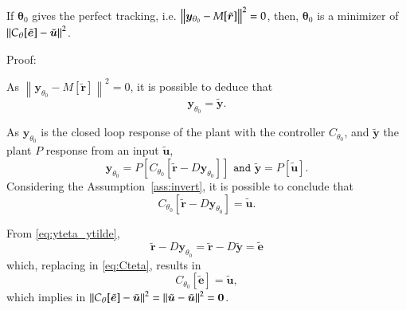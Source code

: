 
\begin{thm} 
   \label{thr:theoremVRFT}
   If $\bm{\theta}_0$ gives the perfect tracking, i.e. $\left\lVert\bm{y}_{\theta_0} - M[\tilde{\bm{r}}] \right\rVert^2 = 0$, then, $\bm{\theta}_0$ is a minimizer of $\left\lVert C_\theta[\tilde{\bm{e}}] - \tilde{\bm{u}}\right\rVert^2$.
\end{thm}

Proof:

As $\left\|\bm{y}_{\theta_0}-M[\tilde{\bm{r}}]\right\|^{2}=0$, it is possible to deduce that
\begin{equation}
\bm{y}_{\theta_0}=\tilde{\bm{y}}.
\label{eq:yteta_ytilde}
\end{equation}

As $\bm{y}_{\theta_0}$ is the closed loop response of the plant with the controller $C_{\theta_0}$, and $\tilde{\bm{y}}$ the plant $P$ response from an input $\tilde{\bm{u}}$,
\begin{equation*}
\bm{y}_{\theta_0}=P\left[C_{\theta_{0}}\left[\tilde{\bm{r}}-D \bm{y}_{\theta_0}\right]\right] \texttt{ and } \tilde{\bm{y}}=P[\tilde{\bm{u}}].
\label{eq:}
\end{equation*}
Considering the Assumption~\ref{ass:invert}, it is possible to conclude that
\begin{equation}
   C_{\theta_{0}}\left[\tilde{\bm{r}}-D \bm{y}_{\theta_0}\right]=\tilde{\bm{u}}.
\label{eq:Cteta}
\end{equation}

From \eqref{eq:yteta_ytilde},
\begin{equation*}
   \tilde{\bm{r}}-D \bm{y}_{\theta_0}=\tilde{\bm{r}}-D \tilde{\bm{y}}=\tilde{\bm{e}}
\label{eq:}
\end{equation*}
which, replacing in \eqref{eq:Cteta}, results in
\begin{equation*}
C_{\theta_{0}}[\tilde{\bm{e}}]=\tilde{\bm{u}},
\label{eq:} 
\end{equation*}
which implies in $\left\lVert C_\theta[\tilde{\bm{e}}] - \tilde{\bm{u}}\right\rVert^2 = \left\lVert\tilde{\bm{u}} - \tilde{\bm{u}}\right\rVert^2 = \bm{0}$.


